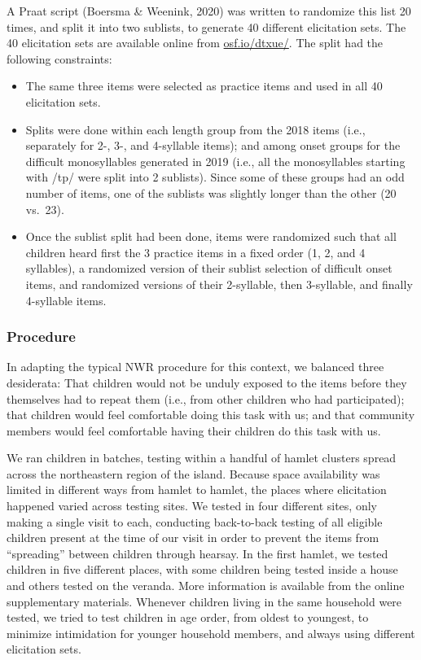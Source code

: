 \documentclass[english,,man,floatsintext]{apa6}
\providecommand{\tightlist}{%
  \setlength{\itemsep}{0pt}\setlength{\parskip}{0pt}}
\begin{document}
A Praat script (Boersma \& Weenink, 2020) was written to randomize this list 20 times, and split it into two sublists, to generate 40 different elicitation sets. The 40 elicitation sets are available online from \href{https://osf.io/dtxue/}{osf.io/dtxue/}. The split had the following constraints:

\begin{itemize}
\tightlist
\item
  The same three items were selected as practice items and used in all 40 elicitation sets.
\item
  Splits were done within each length group from the 2018 items (i.e., separately for 2-, 3-, and 4-syllable items); and among onset groups for the difficult monosyllables generated in 2019 (i.e., all the monosyllables starting with /tp/ were split into 2 sublists). Since some of these groups had an odd number of items, one of the sublists was slightly longer than the other (20 vs.~23).
\item
  Once the sublist split had been done, items were randomized such that all children heard first the 3 practice items in a fixed order (1, 2, and 4 syllables), a randomized version of their sublist selection of difficult onset items, and randomized versions of their 2-syllable, then 3-syllable, and finally 4-syllable items.
\end{itemize}

\hypertarget{procedure}{%
\subsubsection{Procedure}\label{procedure}}

In adapting the typical NWR procedure for this context, we balanced three desiderata: That children would not be unduly exposed to the items before they themselves had to repeat them (i.e., from other children who had participated); that children would feel comfortable doing this task with us; and that community members would feel comfortable having their children do this task with us.

We ran children in batches, testing within a handful of hamlet clusters spread across the northeastern region of the island. Because space availability was limited in different ways from hamlet to hamlet, the places where elicitation happened varied across testing sites. We tested in four different sites, only making a single visit to each, conducting back-to-back testing of all eligible children present at the time of our visit in order to prevent the items from \enquote{spreading} between children through hearsay. In the first hamlet, we tested children in five different places, with some children being tested inside a house and others tested on the veranda. More information is available from the online supplementary materials. Whenever children living in the same household were tested, we tried to test children in age order, from oldest to youngest, to minimize intimidation for younger household members, and always using different elicitation sets.
\end{document}
